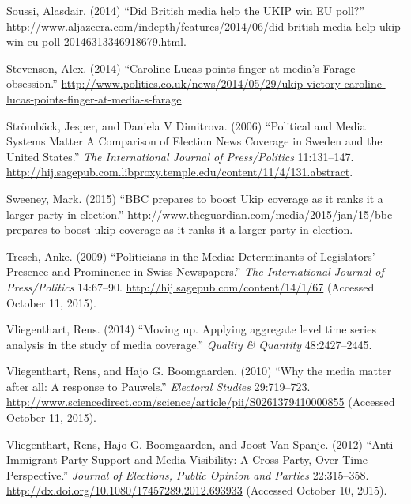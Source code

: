 \documentclass[12pt,article]{article}
\begin{document}
Soussi, Alasdair. (2014) ``Did British media help the UKIP win EU
poll?''
\url{http://www.aljazeera.com/indepth/features/2014/06/did-british-media-help-ukip-win-eu-poll-20146313346918679.html}.

Stevenson, Alex. (2014) ``Caroline Lucas points finger at media's Farage
obsession.''
\url{http://www.politics.co.uk/news/2014/05/29/ukip-victory-caroline-lucas-points-finger-at-media-s-farage}.

Strömbäck, Jesper, and Daniela V Dimitrova. (2006) ``Political and Media
Systems Matter A Comparison of Election News Coverage in Sweden and the
United States.'' \emph{The International Journal of Press/Politics}
11:131--147.
\url{http://hij.sagepub.com.libproxy.temple.edu/content/11/4/131.abstract}.

Sweeney, Mark. (2015) ``BBC prepares to boost Ukip coverage as it ranks
it a larger party in election.''
\url{http://www.theguardian.com/media/2015/jan/15/bbc-prepares-to-boost-ukip-coverage-as-it-ranks-it-a-larger-party-in-election}.

Tresch, Anke. (2009) ``Politicians in the Media: Determinants of
Legislators' Presence and Prominence in Swiss Newspapers.'' \emph{The
International Journal of Press/Politics} 14:67--90.
\url{http://hij.sagepub.com/content/14/1/67} (Accessed October 11,
2015).

Vliegenthart, Rens. (2014) ``Moving up. Applying aggregate level time
series analysis in the study of media coverage.'' \emph{Quality \&
Quantity} 48:2427--2445.

Vliegenthart, Rens, and Hajo G. Boomgaarden. (2010) ``Why the media
matter after all: A response to Pauwels.'' \emph{Electoral Studies}
29:719--723.
\url{http://www.sciencedirect.com/science/article/pii/S0261379410000855}
(Accessed October 11, 2015).

Vliegenthart, Rens, Hajo G. Boomgaarden, and Joost Van Spanje. (2012)
``Anti-Immigrant Party Support and Media Visibility: A Cross-Party,
Over-Time Perspective.'' \emph{Journal of Elections, Public Opinion and
Parties} 22:315--358.
\url{http://dx.doi.org/10.1080/17457289.2012.693933} (Accessed October
10, 2015).
\end{document}
